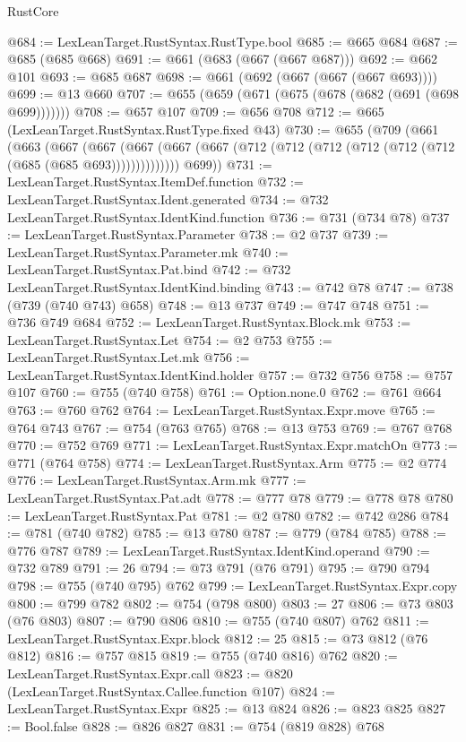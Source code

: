 \begin{lexlean}{RustCore}
\begin{coremodule}
@684 := LexLeanTarget.RustSyntax.RustType.bool
@685 := @665 @684
@687 := @685 (@685 @668)
@691 := @661 (@683 (@667 (@667 @687)))
@692 := @662 @101
@693 := @685 @687
@698 := @661 (@692 (@667 (@667 (@667 @693))))
@699 := @13 @660
@707 := @655 (@659 (@671 (@675 (@678 (@682 (@691 (@698 @699)))))))
@708 := @657 @107
@709 := @656 @708
@712 := @665 (LexLeanTarget.RustSyntax.RustType.fixed @43)
@730 := @655
    (@709
      (@661
        (@663
          (@667
            (@667
              (@667 (@667 (@667 (@712 (@712 (@712 (@712 (@712 (@712 (@685 (@685 @693))))))))))))))
        @699))
@731 := LexLeanTarget.RustSyntax.ItemDef.function
@732 := LexLeanTarget.RustSyntax.Ident.generated
@734 := @732 LexLeanTarget.RustSyntax.IdentKind.function
@736 := @731 (@734 @78)
@737 := LexLeanTarget.RustSyntax.Parameter
@738 := @2 @737
@739 := LexLeanTarget.RustSyntax.Parameter.mk
@740 := LexLeanTarget.RustSyntax.Pat.bind
@742 := @732 LexLeanTarget.RustSyntax.IdentKind.binding
@743 := @742 @78
@747 := @738 (@739 (@740 @743) @658)
@748 := @13 @737
@749 := @747 @748
@751 := @736 @749 @684
@752 := LexLeanTarget.RustSyntax.Block.mk
@753 := LexLeanTarget.RustSyntax.Let
@754 := @2 @753
@755 := LexLeanTarget.RustSyntax.Let.mk
@756 := LexLeanTarget.RustSyntax.IdentKind.holder
@757 := @732 @756
@758 := @757 @107
@760 := @755 (@740 @758)
@761 := Option.none.{0}
@762 := @761 @664
@763 := @760 @762
@764 := LexLeanTarget.RustSyntax.Expr.move
@765 := @764 @743
@767 := @754 (@763 @765)
@768 := @13 @753
@769 := @767 @768
@770 := @752 @769
@771 := LexLeanTarget.RustSyntax.Expr.matchOn
@773 := @771 (@764 @758)
@774 := LexLeanTarget.RustSyntax.Arm
@775 := @2 @774
@776 := LexLeanTarget.RustSyntax.Arm.mk
@777 := LexLeanTarget.RustSyntax.Pat.adt
@778 := @777 @78
@779 := @778 @78
@780 := LexLeanTarget.RustSyntax.Pat
@781 := @2 @780
@782 := @742 @286
@784 := @781 (@740 @782)
@785 := @13 @780
@787 := @779 (@784 @785)
@788 := @776 @787
@789 := LexLeanTarget.RustSyntax.IdentKind.operand
@790 := @732 @789
@791 := 26
@794 := @73 @791 (@76 @791)
@795 := @790 @794
@798 := @755 (@740 @795) @762
@799 := LexLeanTarget.RustSyntax.Expr.copy
@800 := @799 @782
@802 := @754 (@798 @800)
@803 := 27
@806 := @73 @803 (@76 @803)
@807 := @790 @806
@810 := @755 (@740 @807) @762
@811 := LexLeanTarget.RustSyntax.Expr.block
@812 := 25
@815 := @73 @812 (@76 @812)
@816 := @757 @815
@819 := @755 (@740 @816) @762
@820 := LexLeanTarget.RustSyntax.Expr.call
@823 := @820 (LexLeanTarget.RustSyntax.Callee.function @107)
@824 := LexLeanTarget.RustSyntax.Expr
@825 := @13 @824
@826 := @823 @825
@827 := Bool.false
@828 := @826 @827
@831 := @754 (@819 @828) @768

\end{coremodule}
\end{lexlean}
